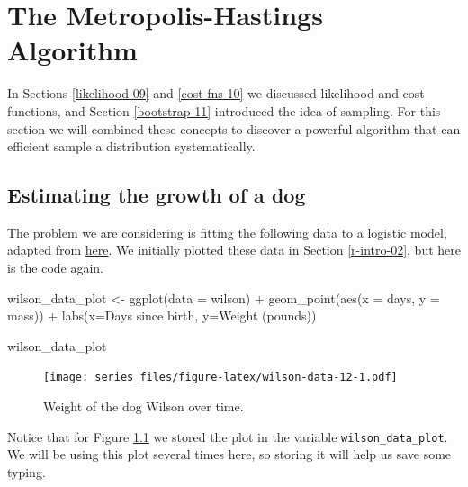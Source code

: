 \documentclass[
]{book}
\newenvironment{Shaded}{\begin{snugshade}}{\end{snugshade}}
\newcommand{\AttributeTok}[1]{\textcolor[rgb]{0.77,0.63,0.00}{#1}}
\newcommand{\FunctionTok}[1]{\textcolor[rgb]{0.00,0.00,0.00}{#1}}
\newcommand{\NormalTok}[1]{#1}
\newcommand{\OtherTok}[1]{\textcolor[rgb]{0.56,0.35,0.01}{#1}}
\newcommand{\SpecialCharTok}[1]{\textcolor[rgb]{0.00,0.00,0.00}{#1}}
\newcommand{\StringTok}[1]{\textcolor[rgb]{0.31,0.60,0.02}{#1}}
\theoremstyle{definition}
\theoremstyle{definition}
\theoremstyle{definition}
\theoremstyle{remark}
\begin{document}
\hypertarget{the-metropolis-hastings-algorithm}{%
\chapter{The Metropolis-Hastings Algorithm}\label{the-metropolis-hastings-algorithm}}

In Sections \ref{likelihood-09} and \ref{cost-fns-10} we discussed likelihood and cost functions, and Section \ref{bootstrap-11} introduced the idea of sampling. For this section we will combined these concepts to discover a powerful algorithm that can efficient sample a distribution systematically.

\hypertarget{estimating-the-growth-of-a-dog}{%
\section{Estimating the growth of a dog}\label{estimating-the-growth-of-a-dog}}

The problem we are considering is fitting the following data to a logistic model, adapted from \href{http://bscheng.com/2014/05/07/modeling-logistic-growth-data-in-r/}{here}. We initially plotted these data in Section \ref{r-intro-02}, but here is the code again.

\begin{Shaded}
\begin{Highlighting}[]
\NormalTok{wilson\_data\_plot }\OtherTok{\textless{}{-}} \FunctionTok{ggplot}\NormalTok{(}\AttributeTok{data =}\NormalTok{ wilson) }\SpecialCharTok{+} 
  \FunctionTok{geom\_point}\NormalTok{(}\FunctionTok{aes}\NormalTok{(}\AttributeTok{x =}\NormalTok{ days, }\AttributeTok{y =}\NormalTok{ mass)) }\SpecialCharTok{+}
  \FunctionTok{labs}\NormalTok{(}\AttributeTok{x=}\StringTok{\textquotesingle{}Days since birth\textquotesingle{}}\NormalTok{,}
         \AttributeTok{y=}\StringTok{\textquotesingle{}Weight (pounds)\textquotesingle{}}\NormalTok{)}

\NormalTok{wilson\_data\_plot}
\end{Highlighting}
\end{Shaded}

\begin{figure}
\centering
\texttt{[image: series\_files/figure-latex/wilson-data-12-1.pdf]}
\caption{\label{fig:wilson-data-12}Weight of the dog Wilson over time.}
\end{figure}

Notice that for Figure \ref{fig:wilson-data-12} we stored the plot in the variable \texttt{wilson\_data\_plot}. We will be using this plot several times here, so storing it will help us save some typing.
\end{document}

